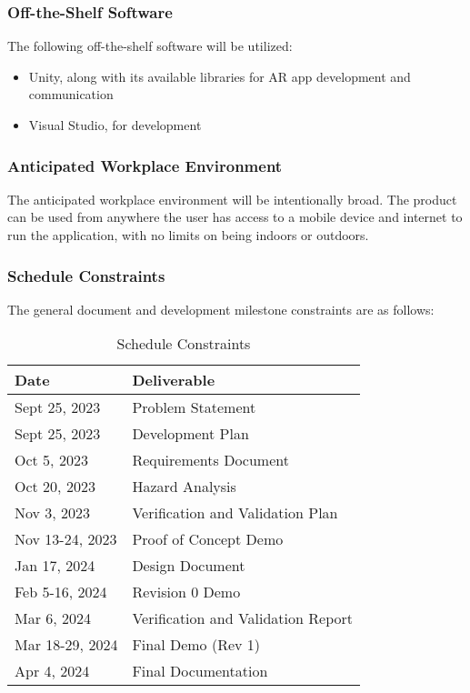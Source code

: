 \documentclass[12pt]{article}
\begin{document}
\subsubsection{Off-the-Shelf Software}
The following off-the-shelf software will be utilized:
\begin{itemize}
	\item Unity, along with its available libraries for AR app development and communication 
        \item Visual Studio, for development
\end{itemize}

\subsubsection{Anticipated Workplace Environment}
The anticipated workplace environment will be intentionally broad. The product can be used from anywhere the user has access to a mobile device and internet to run the application, with no limits on being indoors or outdoors. 

\subsubsection{Schedule Constraints}
The general document and development milestone constraints are as follows:
\begin{table}[H]
	\centering
	\caption{Schedule Constraints}
	\vspace{5pt}
	\begin{tabular}{|p{}|p{}|}
		\hline
		\textbf{Date}   & \textbf{Deliverable}               \\
		\hline
		Sept 25, 2023    & Problem Statement \\
        \hline
		Sept 25, 2023    & Development Plan \\
        \hline
		Oct 5, 2023    & Requirements Document \\
        \hline
		Oct 20, 2023    & Hazard Analysis \\
		\hline
		Nov 3, 2023     & Verification and Validation Plan   \\
		\hline
		Nov 13-24, 2023 & Proof of Concept Demo              \\
		\hline
		Jan 17, 2024    & Design Document                    \\
		\hline
		Feb 5-16, 2024  & Revision 0 Demo                    \\
		\hline
		Mar 6, 2024     & Verification and Validation Report \\
		\hline
		Mar 18-29, 2024 & Final Demo (Rev 1)                 \\
		\hline
		Apr 4, 2024     & Final Documentation                \\
		\hline
	\end{tabular}
\end{table}
\end{document}
